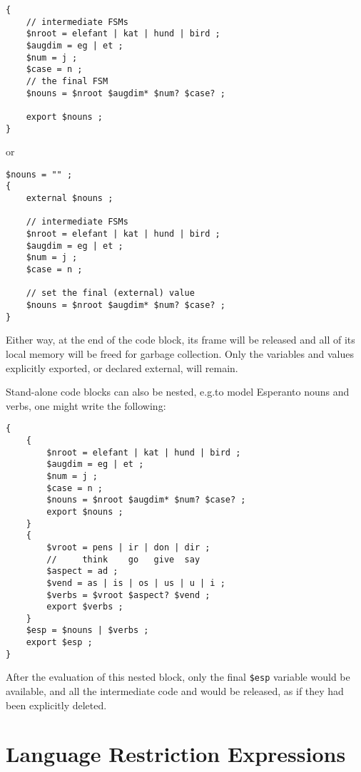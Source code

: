 \begin{samepage}
\begin{Verbatim}
{
    // intermediate FSMs 
    $nroot = elefant | kat | hund | bird ;
    $augdim = eg | et ;
    $num = j ;
    $case = n ;
    // the final FSM 
    $nouns = $nroot $augdim* $num? $case? ;

    export $nouns ;
}
\end{Verbatim}
\end{samepage}

\noindent
or

\begin{Verbatim}
$nouns = "" ;
{
    external $nouns ;

    // intermediate FSMs 
    $nroot = elefant | kat | hund | bird ;
    $augdim = eg | et ;
    $num = j ;
    $case = n ;

    // set the final (external) value
    $nouns = $nroot $augdim* $num? $case? ;
}
\end{Verbatim}

\noindent
Either way, at the end of the code block, its frame will be released and
all of its local memory will be freed for garbage collection.  Only the
variables and values explicitly exported, or declared external, will
remain.

Stand-alone code blocks can also be nested, e.g.\@ to model Esperanto
nouns and verbs, one might write the following:

\begin{Verbatim}
{
    {
        $nroot = elefant | kat | hund | bird ;
        $augdim = eg | et ;
        $num = j ;
        $case = n ;
        $nouns = $nroot $augdim* $num? $case? ;
        export $nouns ;
    }
    {
        $vroot = pens | ir | don | dir ;
        //     think    go   give  say
        $aspect = ad ;
        $vend = as | is | os | us | u | i ;
        $verbs = $vroot $aspect? $vend ;
        export $verbs ;
    }
    $esp = $nouns | $verbs ;
    export $esp ;
}
\end{Verbatim}

\noindent
After the evaluation of this nested block, only the final \verb!$esp!
variable would be available, and all the intermediate code and  
would be released, as if they had been explicitly deleted.

\section{Language Restriction Expressions}

